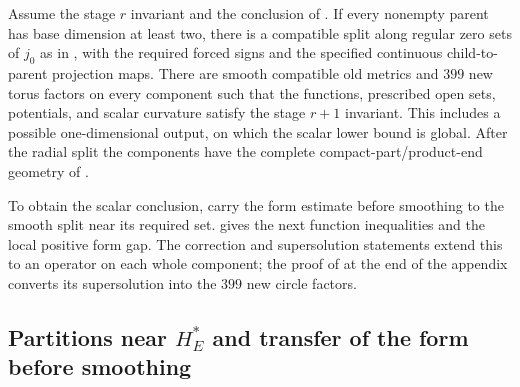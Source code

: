\begin{proposition}\label{regular:step}
Assume the stage $r$ invariant and the conclusion of
.  If every nonempty parent has base dimension at least two, there
is a compatible split along regular zero sets of $j_0$ as in ,
with the required forced signs and the specified continuous
child-to-parent projection maps.  There are smooth compatible old metrics and $399$
new torus factors on every component such that the functions, prescribed open sets,
potentials, and scalar curvature satisfy the stage $r+1$ invariant.
This includes a possible one-dimensional output, on which the scalar
lower bound is global.  After the radial split the components have the
complete compact-part/product-end geometry of
.
\end{proposition}

To obtain the scalar conclusion, 
carry the form estimate before smoothing to the smooth split near its required set.
 gives the next function inequalities and the
local positive form gap. The correction and supersolution statements
 extend this to an operator
on each whole component; the proof of  at the end of
the appendix converts its supersolution into the $399$ new circle factors.

\subsection{Partitions near \texorpdfstring{$H_E^*$}{H\_E*} and transfer of the form before smoothing}

